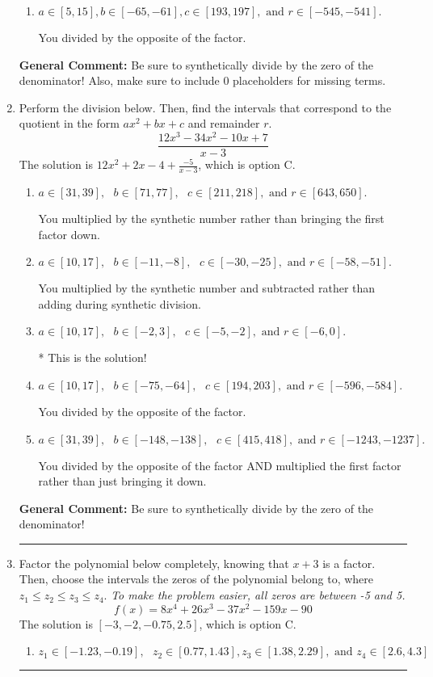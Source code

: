 \documentclass{extbook}[14pt]
\newcommand{\litem}[1]{\item #1

\rule{\textwidth}{0.4pt}}
\begin{document}
\begin{enumerate}
{\begin{enumerate}[label=\Alph*.]
 You multipled by the synthetic number and subtracted rather than adding during synthetic division.
\item \( a \in [5, 15], b \in [-65, -61], c \in [193, 197], \text{ and } r \in [-545, -541]. \)

 You divided by the opposite of the factor.
\end{enumerate}

\textbf{General Comment:} Be sure to synthetically divide by the zero of the denominator! Also, make sure to include 0 placeholders for missing terms.
}
\litem{
Perform the division below. Then, find the intervals that correspond to the quotient in the form $ax^2+bx+c$ and remainder $r$.
\[ \frac{12x^{3} -34 x^{2} -10 x + 7}{x -3} \]The solution is \( 12x^{2} +2 x -4 + \frac{-5}{x -3} \), which is option C.\begin{enumerate}[label=\Alph*.]
\item \( a \in [31, 39], \text{   } b \in [71, 77], \text{   } c \in [211, 218], \text{   and   } r \in [643, 650]. \)

 You multiplied by the synthetic number rather than bringing the first factor down.
\item \( a \in [10, 17], \text{   } b \in [-11, -8], \text{   } c \in [-30, -25], \text{   and   } r \in [-58, -51]. \)

 You multiplied by the synthetic number and subtracted rather than adding during synthetic division.
\item \( a \in [10, 17], \text{   } b \in [-2, 3], \text{   } c \in [-5, -2], \text{   and   } r \in [-6, 0]. \)

* This is the solution!
\item \( a \in [10, 17], \text{   } b \in [-75, -64], \text{   } c \in [194, 203], \text{   and   } r \in [-596, -584]. \)

 You divided by the opposite of the factor.
\item \( a \in [31, 39], \text{   } b \in [-148, -138], \text{   } c \in [415, 418], \text{   and   } r \in [-1243, -1237]. \)

 You divided by the opposite of the factor AND multiplied the first factor rather than just bringing it down.
\end{enumerate}

\textbf{General Comment:} Be sure to synthetically divide by the zero of the denominator!
}
\litem{
Factor the polynomial below completely, knowing that $x + 3$ is a factor. Then, choose the intervals the zeros of the polynomial belong to, where $z_1 \leq z_2 \leq z_3 \leq z_4$. \textit{To make the problem easier, all zeros are between -5 and 5.}
\[ f(x) = 8x^{4} +26 x^{3} -37 x^{2} -159 x -90 \]The solution is \( [-3, -2, -0.75, 2.5] \), which is option C.\begin{enumerate}[label=\Alph*.]
\item \( z_1 \in [-1.23, -0.19], \text{   }  z_2 \in [0.77, 1.43], z_3 \in [1.38, 2.29], \text{   and   } z_4 \in [2.6, 4.3] \)


\end{enumerate}}
\end{enumerate}
\end{document}
